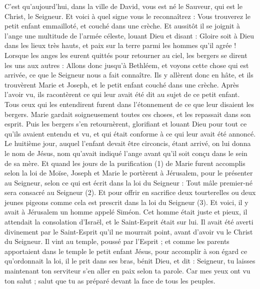 \begin{multicols}{2}
C’est qu'aujourd'hui, dans la ville de David, vous est né le Sauveur, qui est le Christ, le Seigneur.
Et voici à quel signe vous le reconnaîtrez : Vous trouverez le petit enfant emmailloté, et couché dans une crèche.
Et aussitôt il se joignit à l'ange une multitude de l'armée céleste, louant Dieu et disant :
Gloire soit à Dieu dans les lieux très hauts, et paix sur la terre parmi les hommes qu’il agrée !
Lorsque les anges les eurent quittés pour retourner au ciel, les bergers se dirent les uns aux autres : Allons donc jusqu'à Bethléem, et voyons cette chose qui est arrivée, ce que le Seigneur nous a fait connaître.
Ils y allèrent donc en hâte, et ils trouvèrent Marie et Joseph, et le petit enfant couché dans une crèche.
Après l’avoir vu, ils racontèrent ce qui leur avait été dit au sujet de ce petit enfant.
Tous ceux qui les entendirent furent dans l’étonnement de ce que leur disaient les bergers.
Marie gardait soigneusement toutes ces choses, et les repassait dans son esprit.
Puis les bergers s'en retournèrent, glorifiant et louant Dieu pour tout ce qu’ils avaient entendu et vu, et qui était conforme à ce qui leur avait été annoncé.
\TextTitle{[La circoncision]}
Le huitième jour, auquel l'enfant devait être circoncis, étant arrivé, on lui donna le nom de Jésus, nom qu’avait indiqué l'ange avant qu'il soit conçu dans le sein de sa mère.
Et quand les jours de la purification (1) de Marie furent accomplis selon la loi de Moïse, Joseph et Marie le portèrent à Jérusalem, pour le présenter au Seigneur,
selon ce qui est écrit dans la loi du Seigneur : Tout mâle premier-né sera consacré au Seigneur (2).
Et pour offrir en sacrifice deux tourterelles ou deux jeunes pigeons comme cela est prescrit dans la loi du Seigneur (3).
Et voici, il y avait à Jérusalem un homme appelé Siméon. Cet homme était juste et pieux, il attendait la consolation d'Israël, et le Saint-Esprit était sur lui.
Il avait été averti divinement par le Saint-Esprit qu'il ne mourrait point, avant d’avoir vu le Christ du Seigneur.
Il vint au temple, poussé par l'Esprit ; et comme les parents apportaient dans le temple le petit enfant Jésus, pour accomplir à son égard ce qu’ordonnait la loi,
il le prit dans ses bras, bénit Dieu, et dit :
Seigneur, tu laisses maintenant ton serviteur s’en aller en paix selon ta parole.
Car mes yeux ont vu ton salut ;
salut que tu as préparé devant la face de tous les peuples.

\end{multicols}
